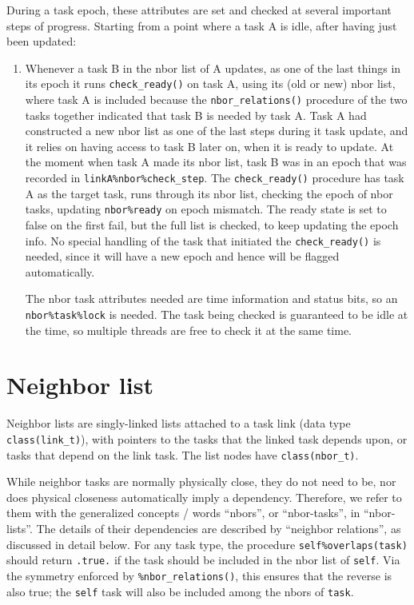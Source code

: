 \documentclass[paper=a4,fontsize=11pt]{scrartcl}
\numberwithin{equation}{section}		%
\numberwithin{figure}{section}			%
\numberwithin{table}{section}				%
\newcommand{\codecolor}{\color{Blue}}
\newcommand{\Code}[1]{{\codecolor\texttt{#1}}}
\def\checkready{\Code{check\_ready()}}
\begin{document}
During a task epoch, these attributes are set and checked at several important steps of progress.  Starting from a point where a task A is idle, after having just been updated:
\begin{enumerate}
    \item Whenever a task B in the nbor list of A updates, as one of the last things in its epoch it runs \checkready{} on task A, using its (old or new) nbor list, where task A is included because the \verb|nbor_relations()| procedure of the two tasks together indicated that task B is needed by task A.  Task A had constructed a new nbor list as one of the last steps during it task update, and it relies on having access to task B later on, when it is ready to update.  At the moment when task A made its nbor list, task B was in an epoch that was recorded in \verb|linkA%nbor%check_step|. The \checkready{} procedure has task A as the target task, runs through its nbor list, checking the epoch of nbor tasks, updating \verb|nbor%ready| on epoch mismatch.  The ready state is set to false on the first fail, but the full list is checked, to keep updating the epoch info.  No special handling of the task that initiated the \checkready{} is needed, since it will have a new epoch and hence will be flagged automatically.

    The nbor task attributes needed are time information and status bits, so an \verb|nbor%task%lock| is needed.  The task being checked is guaranteed to be idle at the time, so multiple threads are free to check it at the same time.
\end{enumerate}

\section{Neighbor list}
Neighbor lists are singly-linked lists attached to a task link (data type \Code{class(link\_t)}), with pointers to the tasks that the linked task depends upon, or tasks that  depend on the link task.  The list nodes have \Code{class(nbor\_t)}.

While neighbor tasks are normally physically close, they do not need to be, nor does physical closeness automatically imply a dependency.  Therefore, we refer to them with the generalized concepts / words ``nbors'', or ``nbor-tasks'', in ``nbor-lists''. The details of their dependencies are described by ``neighbor relations'', as discussed in detail below.   For any task type, the procedure \Code{self\%overlaps(task)} should return \Code{.true.} if the task should be included in the nbor list of \Code{self}.  Via the symmetry enforced by \Code{\%nbor\_relations()}, this ensures that the reverse is also true; the \Code{self} task will also be included among the nbors of \Code{task}.
\end{document}
